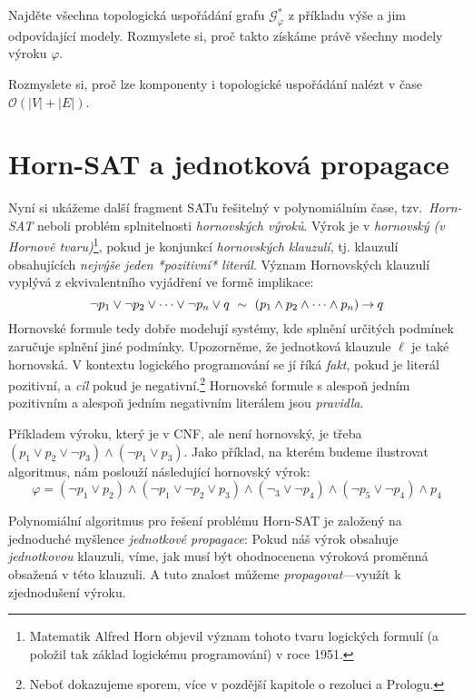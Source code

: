 \begin{exercise}
    Najděte všechna topologická uspořádání grafu $\mathcal G_\varphi^\ast$ z příkladu výše a jim odpovídající modely. Rozmyslete si, proč takto získáme právě všechny modely výroku $\varphi$.
\end{exercise}

\begin{exercise}
    Rozmyslete si, proč lze komponenty i topologické uspořádání nalézt v čase $\mathcal O(|V|+|E|)$.
\end{exercise}

\section{Horn-SAT a jednotková propagace}\label{section:horn-sat}

Nyní si ukážeme další fragment SATu řešitelný v polynomiálním čase, tzv.\ \emph{Horn-SAT} neboli problém splnitelnosti \emph{hornovských výroků}. Výrok je v \emph{hornovský (v Hornově tvaru)}\footnote{Matematik Alfred Horn objevil význam tohoto tvaru logických formulí (a položil tak základ logickému programování) v roce 1951.}, pokud je konjunkcí \emph{hornovských klauzulí}, tj. klauzulí obsahujících \emph{nejvýše jeden *pozitivní* literál}. Význam Hornovských klauzulí vyplývá z ekvivalentního vyjádření ve formě implikace:
$$
\neg p_1\lor \neg p_2\lor \dots \lor \neg p_n\lor q\ \sim\ (p_1\land p_2\land\dots \land p_n)\mathbin{\rightarrow} q
$$
Hornovské formule tedy dobře modelují systémy, kde splnění určitých podmínek zaručuje splnění jiné podmínky. Upozorněme, že jednotková klauzule $\ell$ je také hornovská. V kontextu logického programování se jí říká \emph{fakt}, pokud je literál pozitivní, a \emph{cíl} pokud je negativní.\footnote{Neboť dokazujeme sporem, více v pozdější kapitole o rezoluci a Prologu.} Hornovské formule s alespoň jedním pozitivním a alespoň jedním negativním literálem jsou \emph{pravidla}. 

\begin{example}
    Příkladem výroku, který je v CNF, ale není hornovský, je třeba $(p_1\lor p_2\lor\neg p_3)\land (\neg p_1\lor p_3)$. Jako příklad, na kterém budeme ilustrovat algoritmus, nám poslouží následující hornovský výrok:
    $$
    \varphi=(\neg p_1\lor p_2)\land(\neg p_1\lor\neg p_2\lor p_3)\land(\neg _3\lor\neg p_4)\land(\neg p_5\lor \neg p_4)\land p_4
    $$
\end{example}

Polynomiální algoritmus pro řešení problému Horn-SAT je založený na jednoduché myšlence \emph{jednotkové propagace}: Pokud náš výrok obsahuje \emph{jednotkovou} klauzuli, víme, jak musí být ohodnocenena výroková proměnná obsažená v této klauzuli. A tuto znalost můžeme \emph{propagovat}---využít k zjednodušení výroku. 

